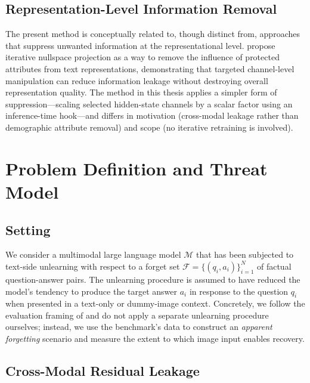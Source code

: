 \documentclass[12pt, a4paper]{article}
\begin{document}
\subsection{Representation-Level Information Removal}

The present method is conceptually related to, though distinct from, approaches that
suppress unwanted information at the representational level.
\citet{nullspace2020} propose iterative nullspace projection as a way to remove the
influence of protected attributes from text representations, demonstrating that
targeted channel-level manipulation can reduce information leakage without destroying
overall representation quality.
The method in this thesis applies a simpler form of suppression---scaling selected
hidden-state channels by a scalar factor using an inference-time hook---and differs
in motivation (cross-modal leakage rather than demographic attribute removal) and scope
(no iterative retraining is involved).


\section{Problem Definition and Threat Model}
\label{sec:problem}

\subsection{Setting}

We consider a multimodal large language model $\mathcal{M}$ that has been subjected to
text-side unlearning with respect to a forget set
$\mathcal{F} = \{(q_i, a_i)\}_{i=1}^{N}$ of factual question-answer pairs.
The unlearning procedure is assumed to have reduced the model's tendency to produce the
target answer $a_i$ in response to the question $q_i$ when presented in a
text-only or dummy-image context.
Concretely, we follow the evaluation framing of \citet{unlok2025} and do not apply
a separate unlearning procedure ourselves; instead, we use the benchmark's data to
construct an \emph{apparent forgetting} scenario and measure the extent to which
image input enables recovery.

\subsection{Cross-Modal Residual Leakage}
\end{document}
